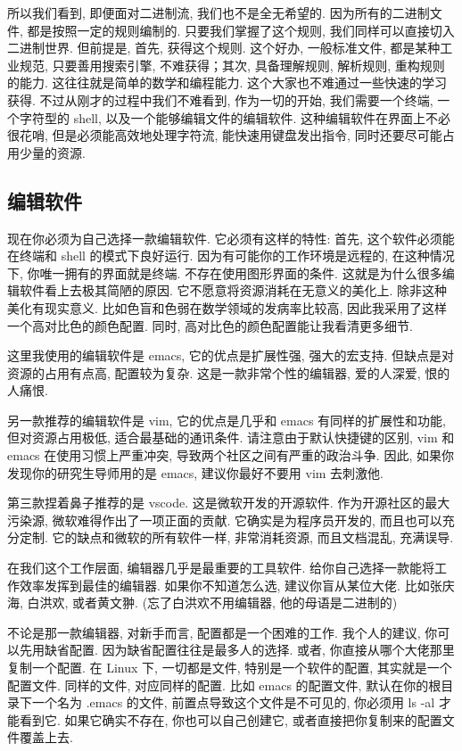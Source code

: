 \documentclass[a4paper]{ctexart}
\begin{document}
所以我们看到, 即便面对二进制流, 我们也不是全无希望的. 因为所有的二进制文件, 都是按照一定的规则编制的.
只要我们掌握了这个规则, 我们同样可以直接切入二进制世界. 但前提是, 首先, 获得这个规则. 这个好办,
一般标准文件, 都是某种工业规范, 只要善用搜索引擎, 不难获得；其次, 具备理解规则, 解析规则, 重构规则的能力.
这往往就是简单的数学和编程能力. 这个大家也不难通过一些快速的学习获得. 不过从刚才的过程中我们不难看到,
作为一切的开始, 我们需要一个终端, 一个字符型的 shell, 以及一个能够编辑文件的编辑软件.
这种编辑软件在界面上不必很花哨, 但是必须能高效地处理字符流, 能快速用键盘发出指令, 同时还要尽可能占用少量的资源.

\subsection{编辑软件}
现在你必须为自己选择一款编辑软件. 它必须有这样的特性: 首先, 这个软件必须能在终端和 shell 的模式下良好运行.
因为有可能你的工作环境是远程的, 在这种情况下, 你唯一拥有的界面就是终端. 不存在使用图形界面的条件.
这就是为什么很多编辑软件看上去极其简陋的原因. 它不愿意将资源消耗在无意义的美化上. 除非这种美化有现实意义.
比如色盲和色弱在数学领域的发病率比较高, 因此我采用了这样一个高对比色的颜色配置. 同时,
高对比色的颜色配置能让我看清更多细节.

这里我使用的编辑软件是 emacs, 它的优点是扩展性强, 强大的宏支持. 但缺点是对资源的占用有点高, 配置较为复杂.
这是一款非常个性的编辑器, 爱的人深爱, 恨的人痛恨.

另一款推荐的编辑软件是 vim, 它的优点是几乎和 emacs 有同样的扩展性和功能, 但对资源占用极低, 适合最基础的通讯条件.
请注意由于默认快捷键的区别, vim 和 emacs 在使用习惯上严重冲突, 导致两个社区之间有严重的政治斗争. 因此,
如果你发现你的研究生导师用的是 emacs, 建议你最好不要用 vim 去刺激他.

第三款捏着鼻子推荐的是 vscode. 这是微软开发的开源软件. 作为开源社区的最大污染源, 微软难得作出了一项正面的贡献.
它确实是为程序员开发的, 而且也可以充分定制. 它的缺点和微软的所有软件一样, 非常消耗资源, 而且文档混乱, 充满误导.

在我们这个工作层面, 编辑器几乎是最重要的工具软件. 给你自己选择一款能将工作效率发挥到最佳的编辑器.
如果你不知道怎么选, 建议你盲从某位大佬. 比如张庆海, 白洪欢, 或者黄文翀.
(忘了白洪欢不用编辑器, 他的母语是二进制的)

不论是那一款编辑器, 对新手而言, 配置都是一个困难的工作. 我个人的建议, 你可以先用缺省配置.
因为缺省配置往往是最多人的选择. 或者, 你直接从哪个大佬那里复制一个配置. 在 Linux 下, 一切都是文件,
特别是一个软件的配置, 其实就是一个配置文件. 同样的文件, 对应同样的配置. 比如 emacs 的配置文件,
默认在你的根目录下一个名为 .emacs 的文件, 前置点导致这个文件是不可见的, 你必须用 ls -al 才能看到它.
如果它确实不存在, 你也可以自己创建它, 或者直接把你复制来的配置文件覆盖上去.
\end{document}
